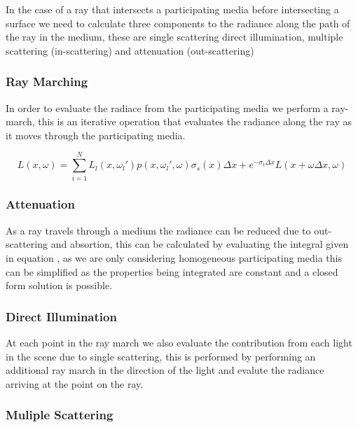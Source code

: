 In the case of a ray that intersects a participating media before intersecting a surface we need to calculate three components to
the radiance along the path of the ray in the medium, these are single scattering direct illumination, multiple scattering (in-scattering)
and attenuation (out-scattering)

\subsubsection{Ray Marching}
In order to evaluate the radiace from the participating media we perform a ray-march, this is an iterative operation that evaluates the
radiance along the ray as it moves through the participating media.

\begin{equation}
L(x, \omega) = \sum\limits_{i = 1}^N L_l(x, \omega_l')p(x, \omega_l', \omega)\sigma_s(x)\Delta x + e^{- \sigma_t \Delta x} L (x + \omega \Delta x, \omega)
\end{equation}

\subsubsection{Attenuation}
As a ray travels through a medium the radiance can be reduced due to out-scattering and absortion, this can be calculated by evaluating
the integral given in equation , as we are only considering homogeneous participating media this can be
simplified as the properties being integrated are constant and a closed form solution is possible.


\subsubsection{Direct Illumination}
At each point in the ray march we also evaluate the contribution from each light in the scene due to single scattering, this is performed
by performing an additional ray march in the direction of the light and evalute the radiance arriving at the point on the ray.

\subsubsection{Muliple Scattering}


